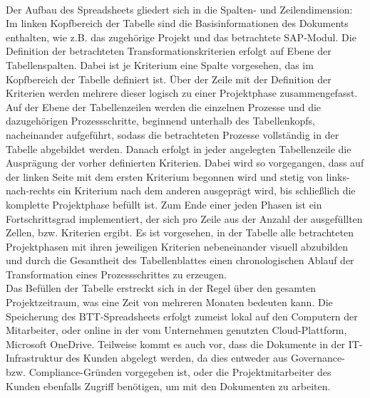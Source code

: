 \\Der Aufbau des Spreadsheets gliedert sich in die Spalten- und Zeilendimension: Im linken Kopfbereich der Tabelle sind die Basisinformationen des Dokuments enthalten, wie z.B. das zugehörige Projekt und das betrachtete SAP-Modul. Die Definition der betrachteten Transformationskriterien erfolgt auf Ebene der Tabellenspalten. Dabei ist je Kriterium eine Spalte vorgesehen, das im Kopfbereich der Tabelle definiert ist. Über der Zeile mit der Definition der Kriterien werden mehrere dieser logisch zu einer Projektphase zusammengefasst. Auf der Ebene der Tabellenzeilen werden die einzelnen Prozesse und die dazugehörigen Prozessschritte, beginnend unterhalb des Tabellenkopfs, nacheinander aufgeführt, sodass die betrachteten Prozesse vollständig in der Tabelle abgebildet werden. Danach erfolgt in jeder angelegten Tabellenzeile die Ausprägung der vorher definierten Kriterien. Dabei wird so vorgegangen, dass auf der linken Seite mit dem ersten Kriterium begonnen wird und stetig von links-nach-rechts ein Kriterium nach dem anderen ausgeprägt wird, bis schließlich die komplette Projektphase befüllt ist. Zum Ende einer jeden Phasen ist ein Fortschrittsgrad implementiert, der sich pro Zeile aus der Anzahl der ausgefüllten Zellen, bzw. Kriterien ergibt. Es ist vorgesehen, in der Tabelle alle betrachteten Projektphasen mit ihren jeweiligen Kriterien nebeneinander visuell abzubilden und durch die Gesamtheit des Tabellenblattes einen chronologischen Ablauf der Transformation eines Prozessschrittes zu erzeugen.\\Das Befüllen der Tabelle erstreckt sich in der Regel über den gesamten Projektzeitraum, was eine Zeit von mehreren Monaten bedeuten kann. Die Speicherung des BTT-Spreadsheets erfolgt zumeist lokal auf den Computern der Mitarbeiter, oder online in der vom Unternehmen genutzten Cloud-Plattform, \glqq{}Microsoft OneDrive\grqq{}. Teilweise kommt es auch vor, dass die Dokumente in der IT-Infrastruktur des Kunden abgelegt werden, da dies entweder aus Governance- bzw. Compliance-Gründen vorgegeben ist, oder die Projektmitarbeiter des Kunden ebenfalls Zugriff benötigen, um mit den Dokumenten zu arbeiten.


